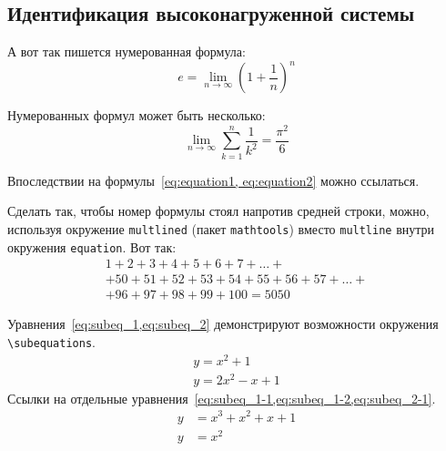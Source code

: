 \subsection{Идентификация высоконагруженной системы}\label{subsec:ch1/sec3/sub3}

А вот так пишется нумерованная формула:
\begin{equation}
    \label{eq:equation1}
    e = \lim_{n \to \infty} \left( 1+\frac{1}{n} \right) ^n
\end{equation}

Нумерованных формул может быть несколько:
\begin{equation}
    \label{eq:equation2}
    \lim_{n \to \infty} \sum_{k=1}^n \frac{1}{k^2} = \frac{\pi^2}{6}
\end{equation}

Впоследствии на формулы~\cref{eq:equation1, eq:equation2} можно ссылаться.

Сделать так, чтобы номер формулы стоял напротив средней строки, можно,
используя окружение \verb|multlined| (пакет \verb|mathtools|) вместо
\verb|multline| внутри окружения \verb|equation|. Вот так:
\begin{equation} %
    \label{eq:equation3}
    \begin{multlined}
        1+ 2+3+4+5+6+7+\dots + \\
        + 50+51+52+53+54+55+56+57 + \dots + \\
        + 96+97+98+99+100=5050
    \end{multlined}
\end{equation}

Уравнения~\cref{eq:subeq_1,eq:subeq_2} демонстрируют возможности
окружения \verb|\subequations|.
\begin{subequations}
    \label{eq:subeq_1}
    \begin{gather}
        y = x^2 + 1 \label{eq:subeq_1-1} \\
        y = 2 x^2 - x + 1 \label{eq:subeq_1-2}
    \end{gather}
\end{subequations}
Ссылки на отдельные уравнения~\cref{eq:subeq_1-1,eq:subeq_1-2,eq:subeq_2-1}.
\begin{subequations}
    \label{eq:subeq_2}
    \begin{align}
        y & = x^3 + x^2 + x + 1 \label{eq:subeq_2-1} \\
        y & = x^2
    \end{align}
\end{subequations}

